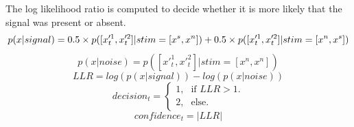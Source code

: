 \documentclass[12pt,twoside]{reedthesis}
\begin{document}
The log likelihood ratio is computed to decide whether it is more likely that the signal was present or absent.
\begin{equation}
p(x|signal)= 0.5 \times p([x'^1_t,x'^2_t]|stim=[x^s,x^n])  \\ 
+ 0.5 \times p([x'^1_t,x'^2_t]|stim=[x^n,x^s])
\end{equation}
\begin{equation}
p(x|noise)= p([x'^1_t,x'^2_t]|stim=[x^n,x^n])
\end{equation}
\begin{equation}
LLR=log(p(x|signal)) - log(p(x|noise))
\end{equation}
\begin{equation}
  decision_t=\begin{cases}
    \text{1}, & \text{if } LLR>1.\\
   \text{2}, & \text{else}.
    
  \end{cases}
\end{equation}
\begin{equation}
confidence_t = |LLR|
\end{equation}
\end{document}
